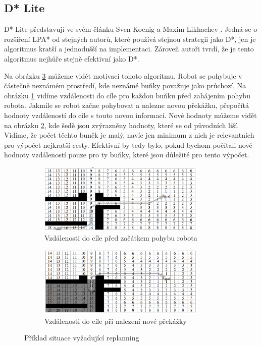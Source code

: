 \subsection{D* Lite}\label{sec:D*Lite}
D* Lite představují ve svém článku Sven Koenig a Maxim Likhachev \cite{Koenig2002}. Jedná se o rozšíření LPA* od stejných autorů, které používá stejnou strategii jako D*, jen je algoritmus kratší a jednodušší na implementaci. Zároveň autoři tvrdí, že je tento algoritmus nejhůře stejně efektivní jako D*.

Na obrázku \ref{obr:D*} můžeme vidět motivaci tohoto algoritmu. Robot se pohybuje v částečně neznámém prostředí, kde neznámé buňky považuje jako průchozí. Na obrázku \ref{obr:D*a} vidíme vzdálenosti do cíle pro každou buňku před zahájením pohybu robota. Jakmile se robot začne pohybovat a nalezne novou překážku, přepočítá hodnoty vzdáleností do cíle s touto novou informací. Nové hodnoty můžeme vidět na obrázku \ref{obr:D*b}, kde šedě jsou zvýrazněny hodnoty, které se od původních liší. Vidíme, že počet těchto buněk je malý, navíc jen minimum z nich je relevantních pro výpočet nejkratší cesty. Efektivní by tedy bylo, pokud bychom počítali nové hodnoty vzdáleností pouze pro ty buňky, které jsou důležité pro tento výpočet.

\begin{figure}[htb]
	\centering
	\begin{subfigure}{.5\textwidth}
		\centering
		\includegraphics[width=8cm]{obr/dStarA}
		\caption{\centering Vzdálenosti do cíle před \linebreak začátkem pohybu robota}
		\label{obr:D*a}
	\end{subfigure}%
	\begin{subfigure}{.5\textwidth}
		\centering
		\includegraphics[width=8cm]{obr/dStarB}
		\caption{\centering Vzdálenosti do cíle při \linebreak nalezení nové překážky}
		\label{obr:D*b}
	\end{subfigure}
	\vspace*{4mm}
	\caption{Příklad situace vyžadující replanning \cite{Koenig2002}}
	\label{obr:D*}
\end{figure}

